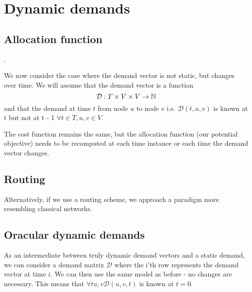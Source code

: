 \documentclass{amsart}
\begin{document}
    \section{Dynamic demands}

    \subsection{Allocation function}.

    We now consider the case where the demand vector is not static, but changes over time. We will assume that the demand vector is a function \[\mathcal{D} : T \times V \times V \rightarrow \mathbb{N}\] and that the demand at time \(t\) from node \(u\) to node \(v\) i.e. \(\mathcal{D}(t, u, v)\) is known at t but not at t - 1 \(\forall t \in T, u, v \in V\).

    The cost function remains the same, but the allocation function (our potential objective) needs to be recomputed at each time instance or each time the demand vector changes.


    \subsection{Routing}

    Alternatively, if we use a routing scheme, we approach a paradigm more resembling classical networks. 



    \subsection{Oracular dynamic demands}

    As an intermediate between truly dynamic demand vectors and a static demand, we can consider a demand matrix \(\mathcal{D}\) where the i'th row represents the demand vector at time \(i\). We can then use the same model as before - no changes are necessary. This means that \(\forall t u, v \mathcal{D}(u, v, t)\) is known at \(t = 0\).
\end{document}

